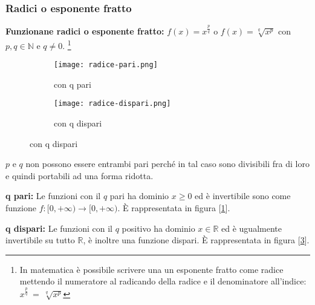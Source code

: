 \subsubsection{Radici o esponente fratto}
\textbf{Funzionane radici o esponente fratto:} $f(x) = x^{\frac{p}{q}}$ o $f(x) = \sqrt[q]{x^p}$  \: \: con  \: \:  $p, q \in \mathbb{N}$ \: \: e  \: \:  $q \neq 0$. \footnote{In matematica è possibile scrivere una un esponente fratto come radice mettendo il numeratore al radicando della radice e il denominatore all'indice: $x^{\frac{p}{q}} \: = \: \sqrt[q]{x^p}$}
\begin{figure}[h!]
    \begin{subfigure}{.5\textwidth}
        \centering
        \texttt{[image: radice-pari.png]}
        \caption{con q pari}
        \label{fig:radice-pari}
    \end{subfigure}
    \begin{subfigure}{.5\textwidth}
        \centering
        \texttt{[image: radice-dispari.png]}
        \caption{con q dispari}
        \label{fig:radice-dispari}
    \end{subfigure}
\end{figure}
\begin{note}
    $p$ e $q$ non possono essere entrambi pari perché in tal caso sono divisibili fra di loro e quindi portabili ad una forma ridotta.
\end{note}
\begin{observation}
    \textbf{q pari:} Le funzioni con il $q$ pari ha dominio $ x \geq 0$ ed è invertibile sono come funzione $f: [0, +\infty) \longrightarrow [0, +\infty)$. È rappresentata in figura [\ref{fig:radice-pari}].
\end{observation}
\begin{observation}
    \textbf{q dispari:} Le funzioni con il $q$ positivo ha dominio $x \in \mathbb{R}$ ed è ugualmente invertibile su tutto $\mathbb{R}$, è inoltre una funzione dispari. È rappresentata in figura [\ref{fig:radice-dispari}].\\
\end{observation}

